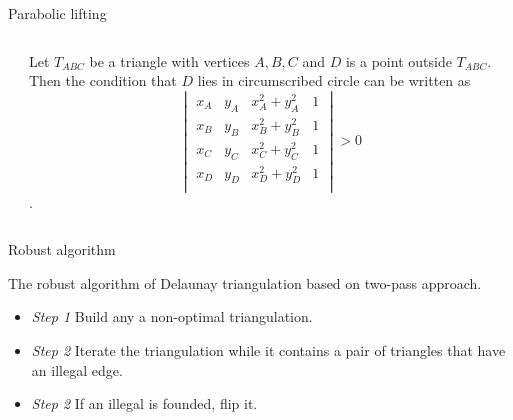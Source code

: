 \documentclass[10pt]{beamer}
\begin{document}
\begin{frame}{Parabolic lifting}
	\begin{columns}
		\begin{column}{0.4\textwidth} 
		\end{column}
		\begin{column}{0.6\textwidth}
			Let $T_{ABC}$ be a triangle with vertices $A,B,C$ 
			and $D$ is a point outside $T_{ABC}$. 
			Then the condition that $D$ lies in circumscribed circle can be written as
			$$
			\begin{vmatrix}
			x_A & y_A & x_A^2 +y_A^2 & 1 \\
			x_B & y_B & x_B^2 +y_B^2 & 1 \\
			x_C & y_C & x_C^2 +y_C^2 & 1 \\
			x_D & y_D & x_D^2 +y_D^2 & 1 \\
			\end{vmatrix} 
			 >0 
			$$.
			
		\end{column}
	\end{columns} 
\end{frame}

\begin{frame}{Robust algorithm}
	
	\alert{The robust} algorithm of Delaunay triangulation based on two-pass approach. 
	
	\begin{itemize}
		\item \textit{Step 1} Build any a non-optimal triangulation.
		\item \textit{Step 2} Iterate the triangulation while it contains a pair of triangles 
							  that have an illegal edge. 
		\item \textit{Step 2} If an illegal is founded, flip it. 		
	\end{itemize}		
	

\end{frame}
\end{document}
